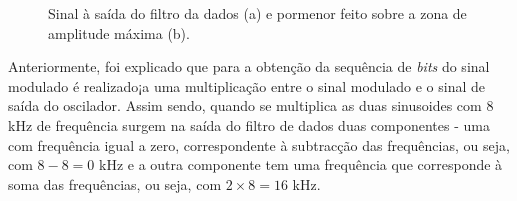 \documentclass[11pt]{article}
\numberwithin{equation}{section}
\begin{document}
\begin{figure}[H]
	\centering
	\hspace{8mm}
	\vspace{-0.8em}
	\caption{Sinal à saída do filtro da dados (a) e pormenor feito sobre a zona de amplitude máxima (b).}
	\label{fig:out1}
	\vspace{-0.8em}
\end{figure}

Anteriormente, foi explicado que para a obtenção da sequência de \textit{bits} do sinal modulado é realizado¡a uma multiplicação entre o sinal modulado e o sinal de saída do oscilador. Assim sendo, quando se multiplica as duas sinusoides com 8 kHz de frequência surgem na saída do filtro de dados duas componentes - uma com frequência igual a zero, correspondente à subtracção das frequências, ou seja, com $8 - 8 = 0$ kHz e a outra componente tem uma frequência que corresponde à soma das frequências, ou seja, com $2 \times 8 = 16$ kHz. 
\end{document}
